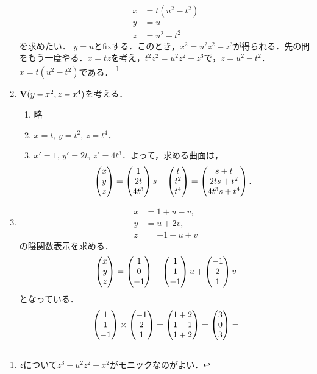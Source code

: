 \documentclass[9pt]{ltjsarticle}
\theoremstyle{break}
\theoremstyle{break}
\theoremstyle{break}
\theoremstyle{break}
\theoremstyle{break}
\theoremstyle{break}
\theoremstyle{break}
\theoremstyle{break}
\theoremstyle{break}
\theoremstyle{break}
\theoremstyle{break}
\theoremstyle{break}
\theoremstyle{break}
\theoremstyle{break}
\theoremstyle{break}
\theoremstyle{nonumberbreak}
\theoremstyle{nonumberbreak}
\begin{document}
\begin{enumerate}[label=(問題\arabic*)]
\begin{align}
 x &= t(u^2-t^2)\\
 y& = u\\
 z& = u^2-t^2
\end{align}
を求めたい．
$y=u$とfixする．このとき，$x^2=u^2z^2 -z^3$が得られる．先の問をもう一度やる．$x=tz$を考え，$t^2z^2=u^2z^2-z^3$で，$z=u^2-t^2$．$x=t(u^2-t^2)$である．
\footnote{$z$について$z^3-u^2z^2+x^2$がモニックなのがよい．}
 \item $\textbf V(y-x^2,z-x^4)$を考える．
\begin{enumerate}[label=(\alph*)]
 \item 略
 \item $x=t,\, y=t^2,\, z=t^4$．
 \item $x'=1,\, y'=2t,\, z'=4t^3$．よって，求める曲面は，
\begin{align}
 \left(\begin{matrix} x\\ y\\ z \end{matrix}\right) = \left(\begin{matrix} 1 \\ 2t \\ 4t^3 \end{matrix}\right)s + \left(\begin{matrix} t \\ t^2 \\ t^4 \end{matrix}\right)
=
\left(\begin{matrix} s + t \\ 2ts + t^2 \\ 4t^3 s + t^4 \end{matrix}\right).
\end{align}
\end{enumerate}
 \item
\begin{align}
 x & = 1 + u-v,\\
 y& = u+2v,\\
 z& = -1-u+v
\end{align}
の陰関数表示を求める．
\begin{align}
 \left(\begin{matrix} x \\ y \\ z \end{matrix}\right) =
\left(\begin{matrix} 1 \\ 0 \\ -1 \end{matrix}\right)
+
\left(\begin{matrix} 1 \\ 1 \\ -1 \end{matrix}\right)u
+
\left(\begin{matrix} -1 \\ 2 \\ 1 \end{matrix}\right)v
\end{align}
となっている．
\begin{align}
 \tatev{1 \\ 1 \\ -1}\times \tatev{-1 \\ 2 \\ 1} =
\tatev{1 + 2 \\ 1 - 1 \\ 1 + 2} =
\tatev{3 \\ 0 \\ 3} =

\end{align}
\end{enumerate}
\end{document}
